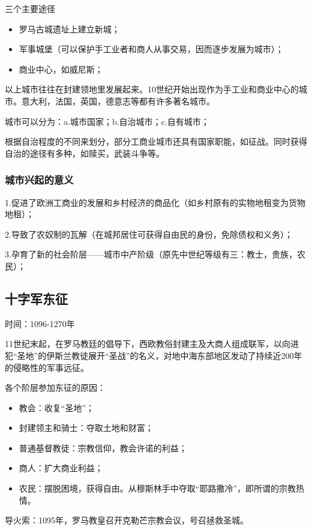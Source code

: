 三个主要途径

\begin{itemize}
    \item 罗马古城遗址上建立新城；
    \item 军事城堡（可以保护手工业者和商人从事交易，因而逐步发展为城市）；
    \item 商业中心，如威尼斯；
\end{itemize}

以上城市往往在封建领地里发展起来。10世纪开始出现作为手工业和商业中心的城市。意大利，法国，英国，德意志等都有许多著名城市。

城市可以分为：a.城市国家；b.自治城市；c.自有城市；

根据自治程度的不同来划分，部分工商业城市还具有国家职能，如征战。同时获得自治的途径有多种，如赎买，武装斗争等。

\subsubsection{城市兴起的意义}

1.促进了欧洲工商业的发展和乡村经济的商品化（如乡村原有的实物地租变为货物地租）；

2.导致了农奴制的瓦解（在城邦居住可获得自由民的身份，免除债权和义务）；

3.孕育了新的社会阶层——城市中产阶级（原先中世纪等级有三：教士，贵族，农民）；

\subsection{十字军东征}
时间：1096-1270年

11世纪末起，在罗马教廷的倡导下，西欧教俗封建主及大商人组成联军，以向进犯“圣地”的伊斯兰教徒展开“圣战”的名义，对地中海东部地区发动了持续近200年的侵略性的军事远征。

各个阶层参加东征的原因：

\begin{itemize}
    \item 教会：收复“圣地”；
    \item 封建领主和骑士：夺取土地和财富；
    \item 普通基督教徒：宗教信仰，教会许诺的利益；
    \item 商人：扩大商业利益；
    \item 农民：摆脱困境，获得自由。从穆斯林手中夺取“耶路撒冷”，即所谓的宗教热情。
\end{itemize}

导火索：1095年，罗马教皇召开克勒芒宗教会议，号召拯救圣城。

